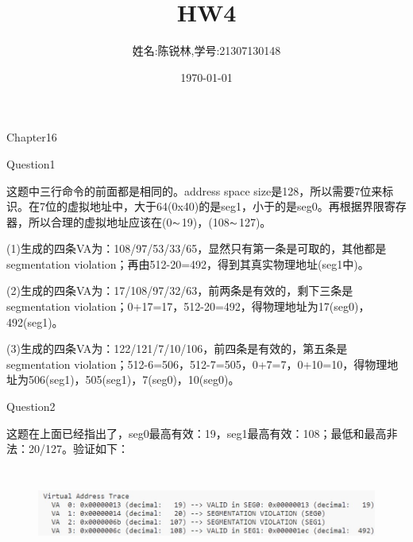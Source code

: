 \documentclass[12pt]{article}
\title{HW4}
\author{姓名:陈锐林,学号:21307130148}
\date{\today}
\begin{document}
\maketitle
\begin{LARGE}
    \noindent Chapter16\\
\end{LARGE}
\begin{large}
	\noindent Question1\\
\end{large}
\hspace*{2em}这题中三行命令的前面都是相同的。address space size是128，所以需要7位来标识。在7位的虚拟地址中，大于64(0x40)的是seg1，小于的是seg0。再根据界限寄存器，所以合理的虚拟地址应该在(0$\thicksim$19)，(108$\thicksim$127)。\par
(1)生成的四条VA为：108/97/53/33/65，显然只有第一条是可取的，其他都是segmentation violation；再由512-20=492，得到其真实物理地址(seg1中)。\par
(2)生成的四条VA为：17/108/97/32/63，前两条是有效的，剩下三条是segmentation violation；0+17=17，512-20=492，得物理地址为17(seg0)，492(seg1)。\par
(3)生成的四条VA为：122/121/7/10/106，前四条是有效的，第五条是segmentation violation；512-6=506，512-7=505，0+7=7，0+10=10，得物理地址为506(seg1)，505(seg1)，7(seg0)，10(seg0)。\\

\begin{large}
	\noindent Question2\\
\end{large}
\hspace*{2em}这题在上面已经指出了，seg0最高有效：19，seg1最高有效：108；最低和最高非法：20/127。验证如下：
\begin{figure}[h]
    \centering
    \includegraphics[width=13cm,height=3cm]{p1.jpg}
\end{figure}\\
\end{document}
